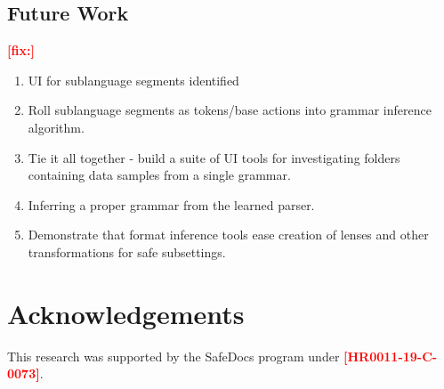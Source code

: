 \documentclass[conference,10pt]{IEEEtran}
\newcommand{\Todo}[1]{\textbf{\textcolor{red}{[#1]}}}
\begin{document}
\subsection{Future Work}
\Todo{fix:}
\begin{enumerate}
    \item UI for sublanguage segments identified
    \item Roll sublanguage segments as tokens/base actions into grammar inference algorithm.
    \item Tie it all together - build a suite of UI tools for investigating folders containing data samples from a single grammar.
    \item Inferring a proper grammar from the learned parser.
    \item Demonstrate that format inference tools ease creation of lenses and other transformations for safe subsettings.
\end{enumerate}


\section*{Acknowledgements}

This research was supported by the SafeDocs program under \Todo{HR0011-19-C-0073}.




% 
\end{document}
